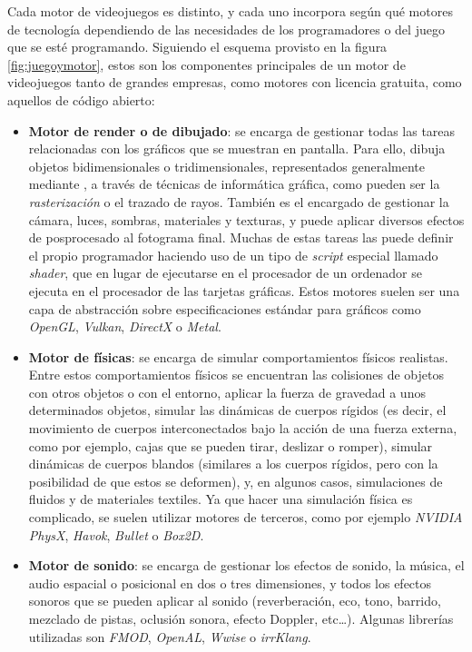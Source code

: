 Cada motor de videojuegos es distinto, y cada uno incorpora según qué motores de tecnología dependiendo de las necesidades de los programadores o del juego que se esté programando. Siguiendo el esquema provisto en la figura \ref{fig:juegoymotor}, estos son los componentes principales de un motor de videojuegos tanto de grandes empresas, como motores con licencia gratuita, como aquellos de código abierto:
\begin{itemize}
\item \textbf{Motor de render o de dibujado}: se encarga de gestionar todas las tareas relacionadas con los gráficos que se muestran en pantalla. Para ello, dibuja objetos bidimensionales o tridimensionales, representados generalmente mediante , a través de técnicas de informática gráfica, como pueden ser la \textit{rasterización} o el trazado de rayos. También es el encargado de gestionar la cámara, luces, sombras, materiales y texturas, y puede aplicar diversos efectos de posprocesado al fotograma final. Muchas de estas tareas las puede definir el propio programador haciendo uso de un tipo de \textit{script} especial llamado \textit{shader}, que en lugar de ejecutarse en el procesador de un ordenador se ejecuta en el procesador de las tarjetas gráficas. Estos motores suelen ser una capa de abstracción sobre especificaciones estándar para gráficos como \textit{OpenGL}, \textit{Vulkan}, \textit{DirectX} o \textit{Metal}.
\item \textbf{Motor de físicas}: se encarga de simular comportamientos físicos realistas. Entre estos comportamientos físicos se encuentran las colisiones de objetos con otros objetos o con el entorno, aplicar la fuerza de gravedad a unos determinados objetos, simular las dinámicas de cuerpos rígidos (es decir, el movimiento de cuerpos interconectados bajo la acción de una fuerza externa, como por ejemplo, cajas que se pueden tirar, deslizar o romper), simular dinámicas de cuerpos blandos (similares a los cuerpos rígidos, pero con la posibilidad de que estos se deformen), y, en algunos casos, simulaciones de fluidos y de materiales textiles. Ya que hacer una simulación física es complicado, se suelen utilizar motores de terceros, como por ejemplo \textit{NVIDIA PhysX}, \textit{Havok}, \textit{Bullet} o \textit{Box2D}.
\item \textbf{Motor de sonido}: se encarga de gestionar los efectos de sonido, la música, el audio espacial o posicional en dos o tres dimensiones, y todos los efectos sonoros que se pueden aplicar al sonido (reverberación, eco, tono, barrido, mezclado de pistas, oclusión sonora, efecto Doppler, etc\ldots). Algunas librerías utilizadas son \textit{FMOD}, \textit{OpenAL}, \textit{Wwise} o \textit{irrKlang}.

\end{itemize}
